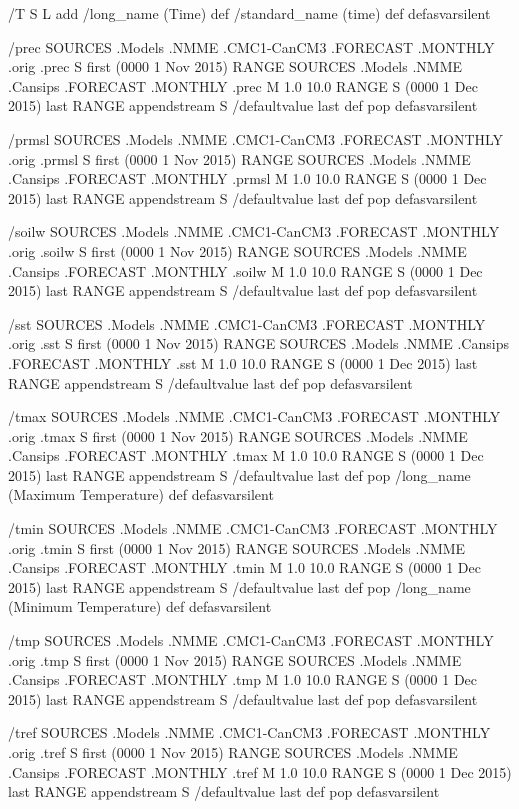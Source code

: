 \begin{ingrid}
/T { S L add
/long_name (Time) def
/standard_name (time) def } defasvarsilent

/prec {
 SOURCES .Models .NMME .CMC1-CanCM3 .FORECAST .MONTHLY .orig .prec
S first (0000 1 Nov 2015) RANGE
 SOURCES .Models .NMME .Cansips .FORECAST .MONTHLY .prec
 M 1.0 10.0 RANGE
S (0000 1 Dec 2015) last RANGE
appendstream
S /defaultvalue last def pop
} defasvarsilent

/prmsl {
 SOURCES .Models .NMME .CMC1-CanCM3 .FORECAST .MONTHLY .orig .prmsl 
S first (0000 1 Nov 2015) RANGE
 SOURCES .Models .NMME .Cansips .FORECAST .MONTHLY .prmsl
 M 1.0 10.0 RANGE
S (0000 1 Dec 2015) last RANGE
appendstream
S /defaultvalue last def pop
} defasvarsilent

/soilw {
SOURCES .Models .NMME .CMC1-CanCM3 .FORECAST .MONTHLY .orig .soilw
S first (0000 1 Nov 2015) RANGE
SOURCES .Models .NMME .Cansips .FORECAST .MONTHLY .soilw
M 1.0 10.0 RANGE
S (0000 1 Dec 2015) last RANGE
appendstream
S /defaultvalue last def pop
} defasvarsilent

/sst {
 SOURCES .Models .NMME .CMC1-CanCM3 .FORECAST .MONTHLY .orig .sst 
S first (0000 1 Nov 2015) RANGE
 SOURCES .Models .NMME .Cansips .FORECAST .MONTHLY .sst
 M 1.0 10.0 RANGE
S (0000 1 Dec 2015) last RANGE
appendstream
S /defaultvalue last def pop
} defasvarsilent

/tmax {
 SOURCES .Models .NMME .CMC1-CanCM3 .FORECAST .MONTHLY .orig .tmax 
S first (0000 1 Nov 2015) RANGE
 SOURCES .Models .NMME .Cansips .FORECAST .MONTHLY .tmax
 M 1.0 10.0 RANGE
S (0000 1 Dec 2015) last RANGE
appendstream
S /defaultvalue last def pop
/long_name (Maximum Temperature) def
} defasvarsilent

/tmin {
 SOURCES .Models .NMME .CMC1-CanCM3 .FORECAST .MONTHLY .orig .tmin 
S first (0000 1 Nov 2015) RANGE
 SOURCES .Models .NMME .Cansips .FORECAST .MONTHLY .tmin
 M 1.0 10.0 RANGE
S (0000 1 Dec 2015) last RANGE
appendstream
S /defaultvalue last def pop
/long_name (Minimum Temperature) def
} defasvarsilent

/tmp {
 SOURCES .Models .NMME .CMC1-CanCM3 .FORECAST .MONTHLY .orig .tmp 
S first (0000 1 Nov 2015) RANGE
 SOURCES .Models .NMME .Cansips .FORECAST .MONTHLY .tmp
 M 1.0 10.0 RANGE
S (0000 1 Dec 2015) last RANGE
appendstream
S /defaultvalue last def pop
} defasvarsilent

/tref {
 SOURCES .Models .NMME .CMC1-CanCM3 .FORECAST .MONTHLY .orig .tref 
S first (0000 1 Nov 2015) RANGE
 SOURCES .Models .NMME .Cansips .FORECAST .MONTHLY .tref
 M 1.0 10.0 RANGE
S (0000 1 Dec 2015) last RANGE
appendstream
S /defaultvalue last def pop
} defasvarsilent


\end{ingrid}
